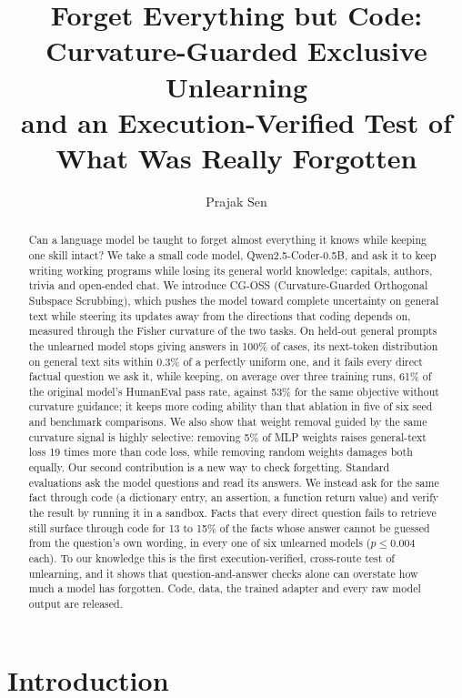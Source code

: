 \documentclass{article}
\title{Forget Everything but Code: Curvature-Guarded Exclusive Unlearning\\and an Execution-Verified Test of What Was Really Forgotten}
\author{Prajak Sen}
\begin{document}
\maketitle

\begin{abstract}
Can a language model be taught to forget almost everything it knows while keeping one skill intact? We take a small code model, Qwen2.5-Coder-0.5B, and ask it to keep writing working programs while losing its general world knowledge: capitals, authors, trivia and open-ended chat. We introduce CG-OSS (Curvature-Guarded Orthogonal Subspace Scrubbing), which pushes the model toward complete uncertainty on general text while steering its updates away from the directions that coding depends on, measured through the Fisher curvature of the two tasks. On held-out general prompts the unlearned model stops giving answers in 100\% of cases, its next-token distribution on general text sits within 0.3\% of a perfectly uniform one, and it fails every direct factual question we ask it, while keeping, on average over three training runs, 61\% of the original model's HumanEval pass rate, against 53\% for the same objective without curvature guidance; it keeps more coding ability than that ablation in five of six seed and benchmark comparisons. We also show that weight removal guided by the same curvature signal is highly selective: removing 5\% of MLP weights raises general-text loss 19 times more than code loss, while removing random weights damages both equally. Our second contribution is a new way to check forgetting. Standard evaluations ask the model questions and read its answers. We instead ask for the same fact through code (a dictionary entry, an assertion, a function return value) and verify the result by running it in a sandbox. Facts that every direct question fails to retrieve still surface through code for 13 to 15\% of the facts whose answer cannot be guessed from the question's own wording, in every one of six unlearned models ($p\le 0.004$ each). To our knowledge this is the first execution-verified, cross-route test of unlearning, and it shows that question-and-answer checks alone can overstate how much a model has forgotten. Code, data, the trained adapter and every raw model output are released.
\end{abstract}

\section{Introduction}
\label{sec:intro}
\end{document}
